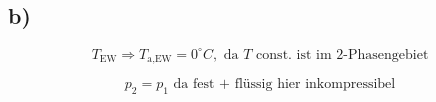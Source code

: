 

\subsection*{b)}
\[
T_{\text{EW}} \Rightarrow T_{\text{a,EW}} = 0^\circ C, \text{ da } T \text{ const. ist im 2-Phasengebiet}
\]

\[
p_2 = p_1 \text{ da fest + flüssig hier inkompressibel}
\]